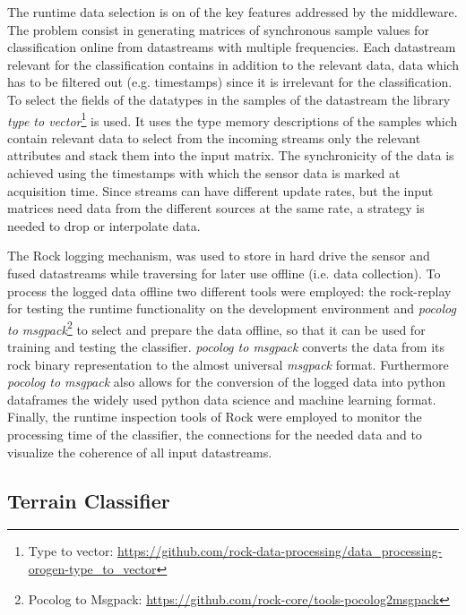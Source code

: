 \documentclass{article}
\begin{document}
The runtime data selection is on of the key features addressed by the middleware. 
The problem consist in generating matrices of synchronous sample values for classification online from datastreams with multiple frequencies.
Each datastream relevant for the classification contains in addition to the relevant data, data which has to be filtered out (e.g. timestamps) since it is irrelevant for the classification.
To select the fields of the datatypes in the samples of the datastream the library \emph{type to vector}\footnote{Type to vector: \url{https://github.com/rock-data-processing/data_processing-orogen-type_to_vector}} is used.
It uses the type memory descriptions of the samples which contain relevant data to select from the incoming streams only the relevant attributes and stack them into the input matrix. 
The synchronicity of the data is achieved using the timestamps with which the sensor data is marked at acquisition time.
Since streams can have different update rates, but the input matrices need data from the different sources at the same rate, a strategy is needed to drop or interpolate data. 

The Rock logging mechanism, was used to store in hard drive the sensor and fused datastreams while traversing for later use offline (i.e. data collection). 
To process the logged data offline two different tools were employed: the rock-replay for testing the runtime functionality on the development environment and \emph{pocolog to msgpack}\footnote{Pocolog to Msgpack: \url{https://github.com/rock-core/tools-pocolog2msgpack}} to select and prepare the data offline, so that it can be used for training and testing the classifier.
\emph{pocolog to msgpack} converts the data from its rock binary representation to the almost universal \emph{msgpack} format.
Furthermore \emph{pocolog to msgpack} also allows for the conversion of the logged data into python dataframes the widely used python data science and machine learning format. 
Finally, the runtime inspection tools of Rock were employed to monitor the processing time of the classifier, the connections for the needed data and to visualize the coherence of all input datastreams. 


\subsection{Terrain Classifier}
\end{document}
